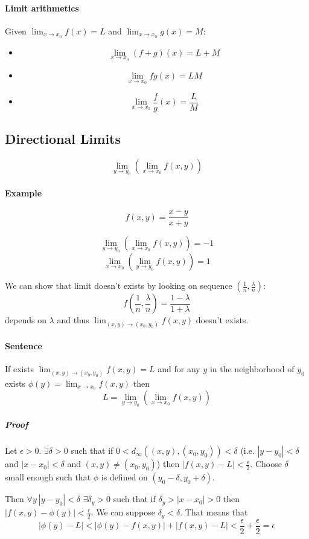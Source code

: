 \paragraph{Limit arithmetics}
Given $\lim_{x\to x_0} f(x) = L$ and $\lim_{x\to x_0} g(x) = M$:
\begin{itemize}
	\item $$\lim_{x\to x_0} (f+g)(x) =L+M$$
	\item $$\lim_{x\to x_0} fg(x) = LM$$
	\item  $$\lim_{x\to x_0} \frac{f}{g}(x) = \frac{L}{M}$$
\end{itemize}
\subsection{Directional Limits }
$$\lim_{y \to y_0} \left(\lim_{x \to x_0} f(x,y)\right)$$
\paragraph{Example}
$$f(x,y) = \frac{x-y}{x+y}$$

$$\lim_{y \to y_0} \left(\lim_{x \to x_0} f(x,y)\right) = -1$$
$$\lim_{x \to x_0}\left( \lim_{y \to y_0}  f(x,y)\right) = 1$$


We can show that limit doesn't exists by looking on sequence $\left(\frac{1}{n}, \frac{\lambda}{n}\right)$:
$$f\left(\frac{1}{n}, \frac{\lambda}{n}\right) = \frac{1-\lambda}{1+\lambda}$$
depends on $\lambda$ and thus $\lim_{(x,y) \to (x_0, y_0)}  f(x,y)$ doesn't exists.
\paragraph{Sentence} If exists $\lim_{(x,y) \to (x_0,y_0)} f(x,y) = L$ and for any $y$ in the neighborhood of $y_0$ exists $\phi(y) = \lim_{x\to x_0} f(x,y)$ then
$$L = \lim_{y\to y_0} \left( \lim_{x \to x_0} f(x,y) \right)$$
\subparagraph{Proof}
Let $\epsilon >0$. $\exists \delta > 0$ such that if $0 < d_\infty((x,y), (x_0,y_0)) < \delta$ (i.e. $|y-y_0| < \delta $ and $|x-x_0|<\delta$ and $(x,y)\neq (x_0,y_0)$) then $\left|f(x,y)-L\right| < \frac{\epsilon}{2}$.
Choose $\delta$ small enough such that $\phi$ is defined on $(y_0-\delta,y_0+\delta)$.

Then $\forall y \: |y-y_0| < \delta$ $\exists \delta_y > 0$ such that if $\delta_y > |x-x_0| > 0$ then $\left|f(x,y) - \phi(y) \right|<  \frac{\epsilon}{2}$. We can suppose $\delta_y < \delta $. That means that
$$\left|\phi(y) - L\right| < \left| \phi(y) - f(x,y) \right| + \left| f(x,y)-L \right|< \frac{\epsilon}{2}+ \frac{\epsilon}{2}  =\epsilon $$

